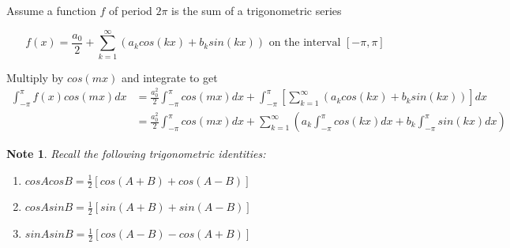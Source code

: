 \documentclass[12pt]{article}
\theoremstyle{plain}
\newtheorem*{note}{Note}
\theoremstyle{definition}
\begin{document}
Assume a function $f$ of period $2\pi$ is the sum of a trigonometric series

$$f(x) = \frac{a_0}{2}+ \sum^\infty_{k=1} (a_k cos(kx) + b_k sin(kx)) \text{ on the interval } [-\pi,\pi]$$

Multiply by $cos(mx)$ and integrate to get
\begin{align*}
    \int^\pi_{-\pi} f(x)cos(mx) dx &= \frac{a_0^2}{2} \int^\pi_{-\pi} cos(mx) dx + \int^\pi_{-\pi} [\sum^\infty_{k=1} (a_k cos(kx) + b_k sin(kx))]dx\\
    &= \frac{a_0^2}{2} \int^\pi_{-\pi} cos(mx) dx +  \sum^\infty_{k=1} (a_k \int^\pi_{-\pi}cos(kx)dx + b_k \int^\pi_{-\pi}sin(kx)dx)
\end{align*}

\begin{note}
    Recall the following trigonometric identities:
    \begin{enumerate}
        \item $cosAcosB = \frac{1}{2} [cos(A+B) + cos(A-B)]$
        \item $cosAsinB = \frac{1}{2} [sin(A+B) + sin(A-B)]$
        \item $sinAsinB = \frac{1}{2} [cos(A-B) - cos(A+B)]$
    \end{enumerate}
\end{note}

\newpage
\end{document}
